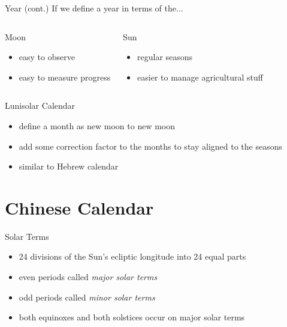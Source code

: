 \documentclass[table]{beamer}
\begin{document}
\begin{frame}{Year (cont.)}
  If we define a year in terms of the...

  \begin{columns}[T]
    \begin{block}{Moon}
      \begin{itemize}
      \item easy to observe
      \item easy to measure progress
      \end{itemize}
    \end{block}

    \begin{block}{Sun}
      \begin{itemize}
      \item regular seasons
      \item easier to manage agricultural stuff
      \end{itemize}
    \end{block}
  \end{columns}
\end{frame}

\begin{frame}{Lunisolar Calendar}
  \begin{itemize}
  \item<+-> define a month as new moon to new moon
  \item<+-> add some correction factor to the months to stay aligned to the seasons
  \item<+-> similar to Hebrew calendar
  \end{itemize}
\end{frame}

\section{Chinese Calendar}

\begin{frame}{Solar Terms}
  \begin{itemize}
  \item<+-> 24 divisions of the Sun's ecliptic longitude into 24 equal parts
  \item<+-> even periods called \textit{major solar terms}
  \item<+-> odd periods called \textit{minor solar terms}
  \item<+-> both equinoxes and both solstices occur on major solar terms
  \end{itemize}
\end{frame}
\end{document}
